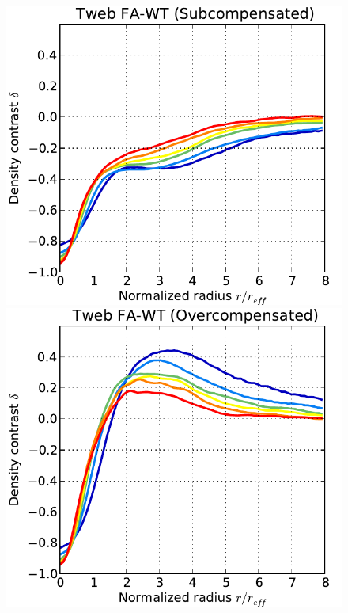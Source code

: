 \documentclass[a4,useAMS,usenatbib,usegraphicx]{mn2e}
\begin{document}
\begin{figure}
\centering
  \includegraphics[trim = 1mm 0mm 5mm 0mm, clip, keepaspectratio=true,
  width=0.32\textheight]{voids_density_TwebFAG0.pdf}
  \includegraphics[trim = 1mm 0mm 5mm 0mm, clip, keepaspectratio=true,
  width=0.32\textheight]{voids_density_TwebFAG1.pdf}


\end{figure}
\end{document}
